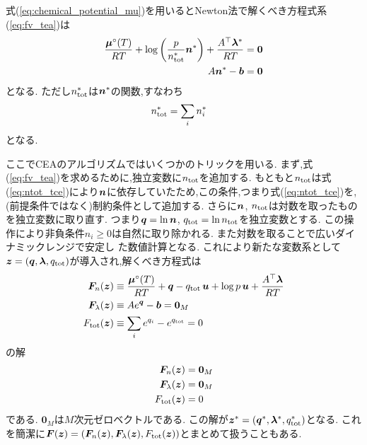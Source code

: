 式(\ref{eq:chemical_potential_mu})を用いるとNewton法で解くべき方程式系(\ref{eq:fv_tea})は
\begin{align}
\label{eq:Lpartialnx}
    \frac{\boldsymbol{\mu}^\circ(T)}{RT}+ \log{\left(\frac{p}{n_\mathrm{tot}^\ast} \boldsymbol{n}^\ast \right)} + \frac{A^\top \boldsymbol{\lambda}^\ast}{RT}   &= \boldsymbol{0} \\
    A \boldsymbol{n}^\ast - \boldsymbol{b} &= \boldsymbol{0}
\end{align}
となる. ただし$n_\mathrm{tot}^\ast$は$\boldsymbol{n}^\ast$の関数,すなわち
\begin{align}
n_\mathrm{tot}^\ast &= \sum_i n_i^\ast
\end{align}
となる. 


ここでCEAのアルゴリズムではいくつかのトリックを用いる. まず,式(\ref{eq:fv_tea})を求めるために,独立変数に$n_\mathrm{tot}$を追加する. もともと$n_\mathrm{tot}$は式(\ref{eq:ntot_tce})により$\boldsymbol{n}$に依存していたため,この条件,つまり式(\ref{eq:ntot_tce})を,(前提条件ではなく)制約条件として追加する. さらに$\boldsymbol{n}$, $n_\mathrm{tot}$は対数を取ったものを独立変数に取り直す. つまり$\boldsymbol{q} = \ln{\boldsymbol{n}}$, $q_\mathrm{tot} = \ln{n_\mathrm{tot}}$を独立変数とする.  この操作により非負条件$n_i \ge 0$は自然に取り除かれる. また対数を取ることで広いダイナミックレンジで安定し
た数値計算となる. これにより新たな変数系として$\boldsymbol{z} = (\boldsymbol{q}, \boldsymbol{\lambda}, q_\mathrm{tot})$が導入され,解くべき方程式は
\begin{align}
\label{eq:Lpartialncea}
    \boldsymbol{F}_n (\boldsymbol{z}) &\equiv \frac{\boldsymbol{\mu}^\circ(T)}{RT} + \boldsymbol{q} - q_\mathrm{tot} \, \boldsymbol{u} + \log{p} \, \boldsymbol{u}  + \frac{A^\top \boldsymbol{\lambda}}{RT}  \\
    \boldsymbol{F}_\lambda (\boldsymbol{z}) &\equiv A e^{\boldsymbol{q}} - \boldsymbol{b} = \boldsymbol{0}_M \\
    F_\mathrm{tot} (\boldsymbol{z}) &\equiv \sum_i {e^{q_i}} - e^{q_\mathrm{tot}} = 0
\end{align}
の解
\begin{align}
  \boldsymbol{F}_n (\boldsymbol{z}) &= \boldsymbol{0}_M \\
  \boldsymbol{F}_\lambda (\boldsymbol{z}) &= \boldsymbol{0}_M \\
  F_\mathrm{tot} (\boldsymbol{z}) &= 0
\end{align}
である. $\boldsymbol{0}_M$は$M$次元ゼロベクトルである. この解が$\boldsymbol{z}^\ast = (\boldsymbol{q}^\ast, \boldsymbol{\lambda}^\ast, q_\mathrm{tot}^\ast)$となる. これを簡潔に$\boldsymbol{F} (\boldsymbol{z}) = (\boldsymbol{F}_n (\boldsymbol{z}), \boldsymbol{F}_\lambda (\boldsymbol{z}), F_\mathrm{tot} (\boldsymbol{z}))$とまとめて扱うこともある.  

